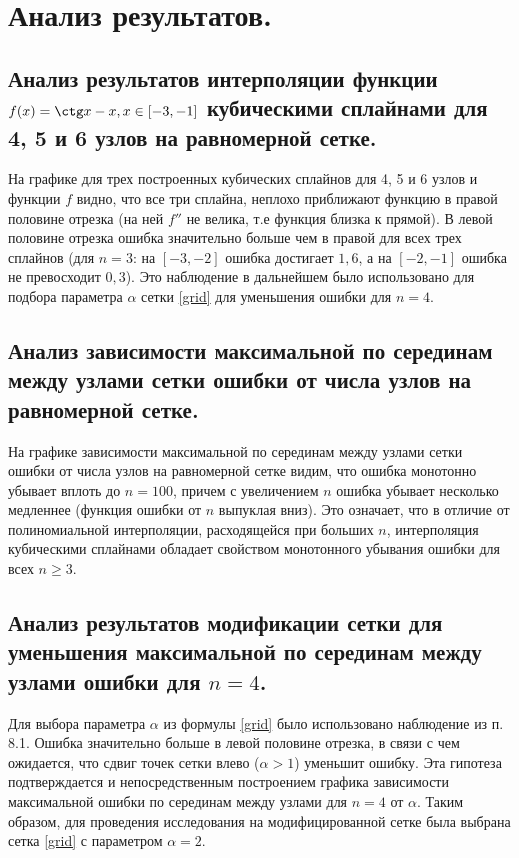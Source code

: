 \documentclass[a4paper, 12pt]{article}
\begin{document}
	\section{Анализ результатов.}
	
	\subsection{Анализ результатов интерполяции функции $f(x)=\ctg x-x, x\in[-3,-1]$ кубическими сплайнами для 4, 5 и 6 узлов на равномерной сетке.} 
	
	На графике для трех построенных кубических сплайнов для 4, 5 и 6 узлов и функции $f$ видно, что все три сплайна, неплохо приближают функцию в правой половине отрезка (на ней $f''$ не велика, т.е функция близка к прямой). В левой половине отрезка ошибка значительно больше чем в правой для всех трех сплайнов (для $n=3$: на $[-3,-2]$ ошибка достигает $1,6$, а на $[-2,-1]$ ошибка не превосходит $0,3$). Это наблюдение в дальнейшем было использовано для подбора параметра $\alpha$ сетки \eqref{grid} для уменьшения ошибки для $n=4$.
	
	\subsection{Анализ зависимости максимальной по серединам между узлами сетки ошибки от числа узлов на равномерной сетке.}
	
	На графике зависимости максимальной по серединам между узлами сетки ошибки от числа узлов на равномерной сетке видим, что ошибка монотонно убывает вплоть до $n=100$, причем с увеличением $n$ ошибка убывает несколько медленнее (функция ошибки от $n$ выпуклая вниз). Это означает, что в отличие от полиномиальной интерполяции, расходящейся при больших $n$, интерполяция кубическими сплайнами обладает свойством монотонного убывания ошибки для всех $n\geq 3$.
	
	\subsection{Анализ результатов модификации сетки для уменьшения максимальной по серединам между узлами ошибки для $n=4$.}
	
	Для выбора параметра $\alpha$ из формулы \eqref{grid} было использовано наблюдение из п. 8.1. Ошибка значительно больше в левой половине отрезка, в связи с чем ожидается, что сдвиг точек сетки влево ($\alpha>1$) уменьшит ошибку. Эта гипотеза подтверждается и непосредственным построением графика зависимости максимальной ошибки по серединам между узлами для $n=4$ от $\alpha$. Таким образом, для проведения исследования на модифицированной сетке была выбрана сетка \eqref{grid} с параметром $\alpha=2$.
	
\end{document}
